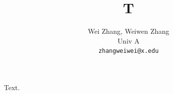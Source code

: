 \documentclass{article}
\title{T}
\author{Wei Zhang, Weiwen Zhang \\ Univ A \\ \texttt{zhangweiwei@x.edu}}
\begin{document}
\maketitle
Text.
\end{document}

